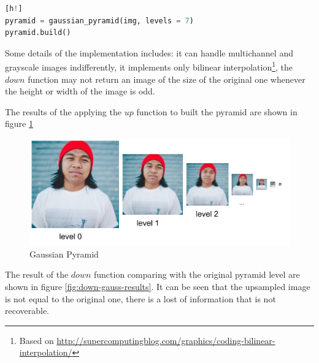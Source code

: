 \begin{lstlisting}[language=python][h!]
pyramid = gaussian_pyramid(img, levels = 7)
pyramid.build()
\end{lstlisting}

Some details of the implementation includes: it can handle multichannel and grayscale images indifferently, it implements only bilinear interpolation\footnote{Based on \url{http://supercomputingblog.com/graphics/coding-bilinear-interpolation/}}, the $down$ function may not return an image of the size of the original one whenever the height or width of the image is odd.

The results of the applying the $up$ function to built the pyramid are shown in figure \ref{fig:gaussian_pyramid}

\begin{figure}[h!]
\centering
  \centering
  \includegraphics[width=0.9\linewidth]{output/gaussianPyramid.pdf}
  \caption{Gaussian Pyramid}
\label{fig:gaussian_pyramid}
\end{figure}

The result of the $down$ function comparing with the original pyramid level are shown in figure \ref{fig:down-gauss-results}. It can be seen that the upsampled image is not equal to the original one, there is a lost of information that is not recoverable.

